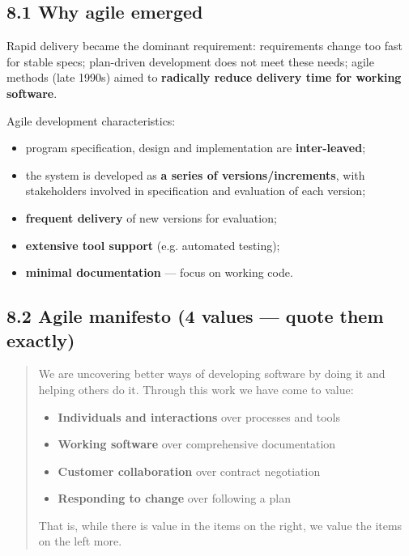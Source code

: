 \begin{studycolumns}
\vspace{0pt}



\subsection*{8.1 Why agile emerged}
Rapid delivery became the dominant requirement: requirements change too fast for stable specs; plan-driven development does not meet these needs; agile methods (late 1990s) aimed to \textbf{radically reduce delivery time for working software}.

Agile development characteristics:

\begin{itemize}
\item program specification, design and implementation are \textbf{inter-leaved};
\item the system is developed as \textbf{a series of versions/\allowbreak{}increments}, with stakeholders involved in specification and evaluation of each version;
\item \textbf{frequent delivery} of new versions for evaluation;
\item \textbf{extensive tool support} (e.g. automated testing);
\item \textbf{minimal documentation} --- focus on working code.
\end{itemize}
\subsection*{8.2 Agile manifesto (4 values --- quote them exactly)}

\begin{quote}\small\color{navy}
We are uncovering better ways of developing software by doing it and helping others do it. Through this work we have come to value:

\begin{itemize}
\item \textbf{Individuals and interactions} over processes and tools
\item \textbf{Working software} over comprehensive documentation
\item \textbf{Customer collaboration} over contract negotiation
\item \textbf{Responding to change} over following a plan
\end{itemize}
That is, while there is value in the items on the right, we value the items on the left more.


\end{quote}
\end{studycolumns}
